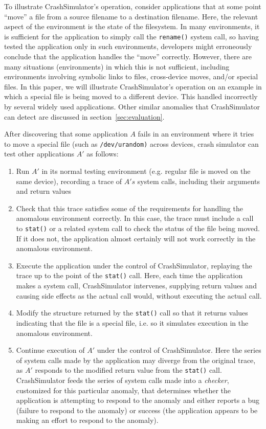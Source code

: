 To illustrate CrashSimulator's operation, consider applications that
at some point ``move'' a file from a source filename to a destination filename.
Here, the relevant aspect of the environment is the state of the filesystem.
In many environments, it is sufficient for the application to simply call the {\tt rename()} system call, so having tested
the application only in such environments, developers might erroneously conclude that the application handles the ``move'' correctly.
However, there are many situations (environments) in which this is not sufficient, including environments involving symbolic links to files,
cross-device moves, and/or special files.
In this paper, we will illustrate CrashSimulator's operation on an example in which a special file is being moved to a different device.
This handled incorrectly by several widely used applications. Other similar anomalies that CrashSimulator can detect are discussed in section~\ref{sec:evaluation}.

After discovering that some application $A$ fails in an environment where it tries to move a special file (such as {\tt /dev/urandom)} across
devices, crash simulator can test other applications $A'$ as follows:
\begin{enumerate}
	\item
		Run $A'$ in its normal testing environment (e.g. regular file is moved on the same device), recording a trace of $A's$ system calls, including their arguments and return values
	\item
		Check that this trace satisfies some of the requirements for handling the anomalous environment correctly. In this case, the trace must include a call to {\tt stat()} or a related system call to check the status of the file being moved. If it does not, the application almost certainly will not work correctly in the anomalous environment.
	\item Execute the application under the control of CrashSimulator, replaying the trace up to the point of the {\tt stat()} call. Here, each time the application makes a system call, CrashSimulator intervenes, supplying return values and causing side effects as the actual call would, without executing the actual call.
	\item
		Modify the structure returned by the {\tt stat()} call so that it returns values indicating that the file is a special file, i.e. so it simulates execution in the anomalous environment.
	\item
		Continue execution of $A'$ under the control of CrashSimulator. Here the series of system calls made by
                the application may diverge from the original trace, as $A'$ responds to the modified return value from
                the {\tt stat()} call. CrashSimulator feeds the series of system calls made into a {\em checker},
                customized for this particular anomaly, that determines whether the application is attempting to respond
                to the anomaly and either reports a bug (failure to respond to the anomaly) or success (the application
                appears to be making an effort to respond to the anomaly).
\end{enumerate}


